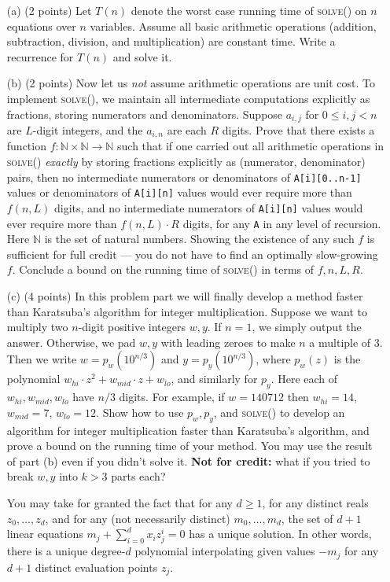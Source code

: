 \documentclass[12pt]{article}
\begin{document}
\begin{itemize}
\item[(a)] (2 points) Let $T(n)$ denote the worst case running time of \textsc{solve()} on $n$ equations over $n$ variables. Assume all basic arithmetic operations (addition, subtraction, division, and multiplication) are constant time. Write a recurrence for $T(n)$ and solve it.
\item[(b)] (2 points) Now let us {\em not} assume arithmetic operations are unit cost. To implement \textsc{solve()}, we maintain all intermediate computations explicitly as fractions, storing numerators and denominators. Suppose $a_{i,j}$ for $0\le i,j< n$ are $L$-digit integers, and the $a_{i,n}$ are each $R$ digits. Prove that there exists a function $f:\mathbb{N}\times\mathbb{N}\rightarrow\mathbb{N}$ such that if one carried out all arithmetic operations in \textsc{solve()} {\em exactly} by storing fractions explicitly as (numerator, denominator) pairs, then no intermediate numerators or denominators of \texttt{A[i][0..n-1]} values or denominators of \texttt{A[i][n]} values would ever require more than $f(n, L)$ digits, and no intermediate numerators of \texttt{A[i][n]} values would ever require more than $f(n, L) \cdot R$ digits, for any \texttt{A} in any level of recursion. Here $\mathbb{N}$ is the set of natural numbers. Showing the existence of any such $f$ is sufficient for full credit --- you do not have to find an optimally slow-growing $f$. Conclude a bound on the running time of \textsc{solve()} in terms of $f, n, L, R$.
\item[(c)] (4 points) In this problem part we will finally develop a method faster than Karatsuba's algorithm for integer multiplication. Suppose we want to multiply two $n$-digit positive integers $w, y$. If $n = 1$, we simply output the answer. Otherwise, we pad $w,y$ with leading zeroes to make $n$ a multiple of $3$. Then we write $w = p_w(10^{n/3})$ and $y = p_y(10^{n/3})$, where $p_w(z)$ is the polynomial $w_{hi}\cdot z^2 + w_{mid}\cdot z + w_{lo}$, and similarly for $p_y$. Here each of $w_{hi}, w_{mid}, w_{lo}$ have $n/3$ digits. For example, if $w = 140712$ then $w_{hi} = 14$, $w_{mid} = 7$, $w_{lo} = 12$. Show how to use $p_w, p_y$, and \textsc{solve()} to develop an algorithm for integer multiplication faster than Karatsuba's algorithm, and prove a bound on the running time of your method. You may use the result of part (b) even if you didn't solve it. \textbf{Not for credit:} what if you tried to break $w,y$ into $k>3$ parts each?

You may take for granted the fact that for any $d\ge 1$, for any distinct reals $z_0,\ldots,z_d$, and for any (not necessarily distinct) $m_0,\ldots,m_d$, the set of $d+1$ linear equations $m_j + \sum_{i=0}^d x_i z_j^i = 0$ has a unique solution. In other words, there is a unique degree-$d$ polynomial interpolating given values $-m_j$ for any $d+1$ distinct evaluation points $z_j$.
\end{itemize}
\end{document}
